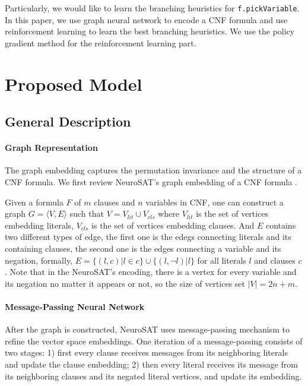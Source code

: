 \documentclass[sigplan,10pt]{acmart}\settopmatter{printfolios=true,printccs=false,printacmref=false}
\begin{document}
Particularly, we would like to learn the branching heuristics for \texttt{f.pickVariable}.
In this paper, we use graph neural network to encode a CNF formula and use reinforcement learning 
to learn the best branching heuristics.
We use the policy gradient method for the reinforcement learning part.

\section{Proposed Model}

\subsection{General Description}

\paragraph{Graph Representation}

The graph embedding captures the permutation invariance and the structure of a CNF formula.
We first review NeuroSAT's graph embedding of a CNF formula \cite{selsam2018learning}.

Given a formula $F$ of $m$ clauses and $n$ variables in CNF, 
one can construct a graph $G = \langle V, E \rangle$ such that 
$V = V_{lit} \cup V_{cls}$ where $V_{lit}$ is the set of vertices embedding literals,
$V_{cls}$ is the set of vertices embedding clauses. 
And $E$ contains two different types of edge, the first one is the edegs connecting literals and its
containing clauses, the second one is the edges connecting a variable and its negation, formally,
$ E = \{ (l, c) | l \in c \} \cup \{ (l, \neg l) | l \}$ for all literals $l$ and clauses $c$.
Note that in the NeuroSAT's encoding, there is a vertex for every variable and its negation no matter
it appears or not, so the size of vertices set $|V| = 2n + m$.

\paragraph{Message-Passing Neural Network}

After the graph is constructed, NeuroSAT uses message-passing mechanism to refine the vector space embeddings.
One iteration of a message-passing consists of two stages:
1) first every clause receives messages from its neighboring literals and update the clause embedding;
2) then every literal receives its message from its neighboring clauses and its negated literal vertices,
and update its embedding.
\end{document}
